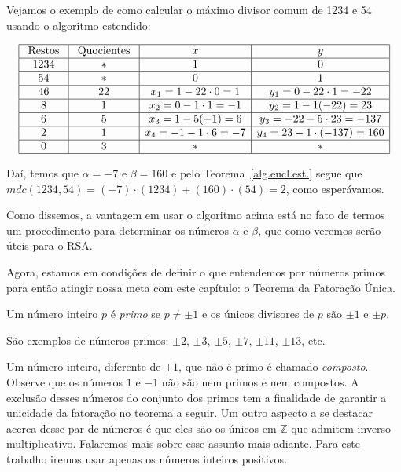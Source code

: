 Vejamos o exemplo de como calcular o m\'{a}ximo divisor comum de 1234 e 54 usando o algoritmo estendido:

\[
\begin{array}{|c|c|c|c|}\hline
\textrm{ Restos } & \textrm{ Quocientes } & x       								& y \\ \hline
				1234 	    & \ast     							& 1      									& 0 \\ \hline
				54  			& \ast     							& 0       								& 1 \\ \hline
				46        & 22   					 	  		& x_{1}=1-22\cdot 0 = 1   & y_{1}=0-22\cdot 1=-22 \\ \hline
				8     		& 1    									& x_{2}=0-1\cdot 1=-1     & y_{2}=1-1(-22)=23 \\ \hline
				6    	  	& 5    									& x_{3}=1-5(-1)=6         & y_{3}=-22-5\cdot 23=-137 \\ \hline  
				2    			& 1   									& x_{4}=-1-1\cdot 6=-7    & y_{4}=23-1\cdot(-137)=160 \\ \hline
				0   			& 3  										& \ast                    & \ast    \\ \hline
\end{array}
\]

Da\'{i}, temos que $\alpha=-7$ e $\beta=160$ e pelo Teorema~\ref{alg.eucl.est.} segue que
$mdc(1234,54)=(-7)\cdot(1234)+(160)\cdot(54)=2$, como esper\'{a}vamos.

Como dissemos, a vantagem em usar o algoritmo acima est\'{a} no fato de termos um procedimento para determinar os n\'{u}meros
$\alpha$ e $\beta$, que como veremos ser\~{a}o \'{u}teis para o RSA.

Agora, estamos em condi\c{c}\~{o}es de definir o que entendemos por n\'umeros primos para ent\~ao atingir nossa meta com este 
cap\'itulo: o Teorema da Fatora\c{c}\~ao \'Unica.

\begin{Df}
Um n\'umero inteiro $p$ \'e \textit{primo} se $p\neq \pm 1$ e os \'unicos divisores de $p$ s\~ao $\pm 1$ e $\pm p$. 
\end{Df} 

S\~ao exemplos de n\'umeros primos: $\pm 2$, $\pm 3$, $\pm 5$, $\pm 7$, $\pm 11$, $\pm 13$, etc.

Um n\'umero inteiro, diferente de $\pm 1$, que n\~ao \'e primo \'e chamado \textit{composto}. Observe que os n\'umeros $1$ e $-1$ n\~ao s\~ao nem primos e nem compostos. A exclus\~ao desses n\'umeros do conjunto dos primos tem a finalidade de garantir a unicidade da fatora\c{c}\~ao no teorema a seguir. Um outro aspecto a se destacar acerca desse par de n\'umeros \'e que eles s\~ao os \'unicos em $\mathbb{Z}$ que admitem inverso multiplicativo. Falaremos mais sobre esse assunto mais adiante. Para este trabalho iremos usar apenas os n\'umeros inteiros positivos.

